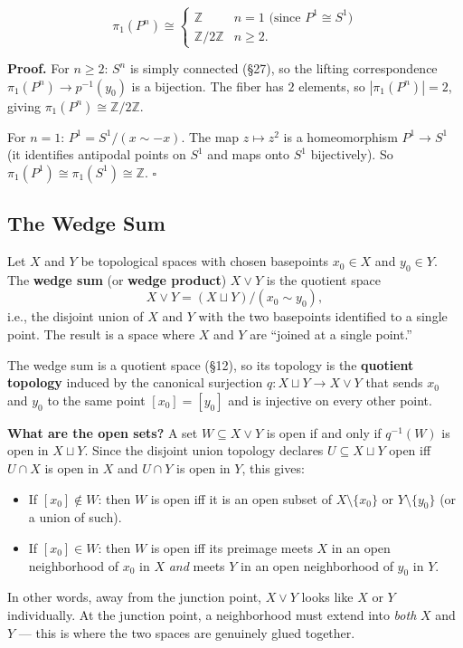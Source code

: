 \documentclass[11pt]{report}
\renewenvironment{proof}[1][Proof]{\noindent\textbf{#1.} }{\hfill$\square$\par\vspace{5pt}}
\begin{document}
\begin{thmbox}
\[\pi_1(P^n) \cong \begin{cases} \mathbb{Z} & n = 1 \text{ (since $P^1 \cong S^1$)} \\ \mathbb{Z}/2\mathbb{Z} & n \geq 2. \end{cases}\]
\end{thmbox}

\begin{proof}
For $n \geq 2$: $S^n$ is simply connected (\S 27), so the lifting correspondence $\pi_1(P^n) \to p^{-1}(y_0)$ is a bijection. The fiber has $2$ elements, so $|\pi_1(P^n)| = 2$, giving $\pi_1(P^n) \cong \mathbb{Z}/2\mathbb{Z}$.

For $n = 1$: $P^1 = S^1 / (x \sim -x)$. The map $z \mapsto z^2$ is a homeomorphism $P^1 \to S^1$ (it identifies antipodal points on $S^1$ and maps onto $S^1$ bijectively). So $\pi_1(P^1) \cong \pi_1(S^1) \cong \mathbb{Z}$.
\end{proof}

\subsection{The Wedge Sum}

\begin{defbox}
Let $X$ and $Y$ be topological spaces with chosen basepoints $x_0 \in X$ and $y_0 \in Y$. The \textbf{wedge sum} (or \textbf{wedge product}) $X \vee Y$ is the quotient space
\[X \vee Y = (X \sqcup Y) / (x_0 \sim y_0),\]
i.e., the disjoint union of $X$ and $Y$ with the two basepoints identified to a single point. The result is a space where $X$ and $Y$ are ``joined at a single point.''
\end{defbox}

\begin{rembox}
The wedge sum is a quotient space (\S 12), so its topology is the \textbf{quotient topology} induced by the canonical surjection $q: X \sqcup Y \to X \vee Y$ that sends $x_0$ and $y_0$ to the same point $[x_0] = [y_0]$ and is injective on every other point.

\textbf{What are the open sets?} A set $W \subseteq X \vee Y$ is open if and only if $q^{-1}(W)$ is open in $X \sqcup Y$. Since the disjoint union topology declares $U \subseteq X \sqcup Y$ open iff $U \cap X$ is open in $X$ and $U \cap Y$ is open in $Y$, this gives:
\begin{itemize}[nosep]
    \item If $[x_0] \notin W$: then $W$ is open iff it is an open subset of $X \setminus \{x_0\}$ or $Y \setminus \{y_0\}$ (or a union of such).
    \item If $[x_0] \in W$: then $W$ is open iff its preimage meets $X$ in an open neighborhood of $x_0$ in $X$ \emph{and} meets $Y$ in an open neighborhood of $y_0$ in $Y$.
\end{itemize}
In other words, away from the junction point, $X \vee Y$ looks like $X$ or $Y$ individually. At the junction point, a neighborhood must extend into \emph{both} $X$ and $Y$ --- this is where the two spaces are genuinely glued together.
\end{rembox}
\end{document}
